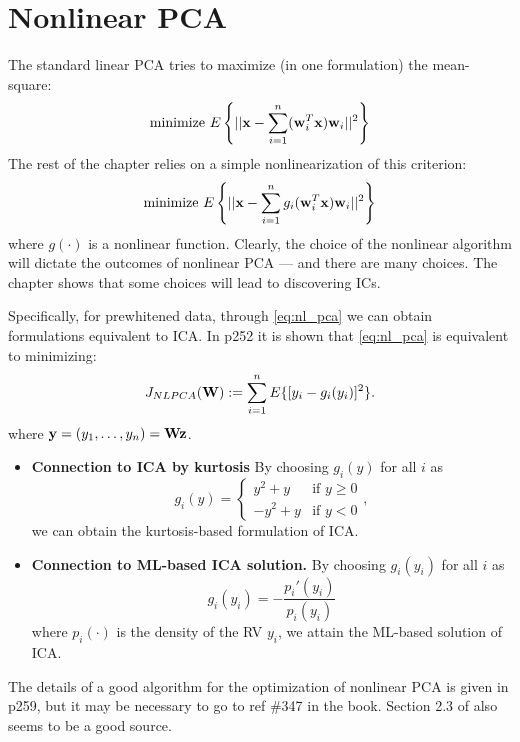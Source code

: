\documentclass[a4paper, one	side]{book}
\begin{document}
\section{Nonlinear PCA}
The standard linear PCA tries to maximize (in one formulation) the mean-square:
\begin{equation}
\text{minimize}\,\, E\left\{ ||\mathbf x - \sum\limits_{i=1}^n (\mathbf w_i^T \mathbf x) \mathbf w_i||^2 \right\}
\end{equation}
The rest of the chapter relies on a simple nonlinearization of this criterion:
\begin{equation}
\text{minimize}\,\, E\left\{ ||\mathbf x - \sum\limits_{i=1}^n g_i(\mathbf w_i^T \mathbf x) \mathbf w_i||^2 \right\}
\label{eq:nl_pca}
\end{equation}
where $g(\cdot)$ is a nonlinear function. Clearly, the choice of the nonlinear algorithm will dictate the outcomes of nonlinear PCA \---- and there are many choices. The chapter shows that some choices will lead to discovering ICs.

Specifically, for prewhitened data, through \eqref{eq:nl_pca} we can obtain formulations equivalent to ICA. In p252 it is shown that \eqref{eq:nl_pca} is equivalent to minimizing:  
\begin{equation}
J_{NLPCA}(\mathbf W) := \sum_{i=1}^n E\{[y_i-g_i(y_i)]^2\}.
\label{eq:J_nlpca}
\end{equation}
where $\mathbf y = (y_1,\hdots,y_n) = \mathbf{Wz}$.

\begin{itemize}
\item \textbf{Connection to ICA by kurtosis} By choosing $g_i(y)$ for all $i$ as 
$$g_i(y) = \begin{cases} y^2 + y & \text{if}\,\, y \ge 0 \\ -y^2 + y & \text{if}\,\, y<0 \end{cases},$$
we can obtain the kurtosis-based formulation of ICA.
\item \textbf{Connection to ML-based ICA solution.} By choosing $g_i(y_i)$ for all $i$ as %
$$g_i(y_i) = -\frac{p_i'(y_i)}{p_i(y_i)}$$
where $p_i(\cdot)$ is the density of the RV $y_i$, we attain the ML-based solution of ICA. \end{itemize}
The details of a good algorithm for the optimization of nonlinear PCA is given in p259, but it may be necessary to go to ref \#347 in the book. Section 2.3 of \cite{landqvist05} also seems to be a good source.
\end{document}
